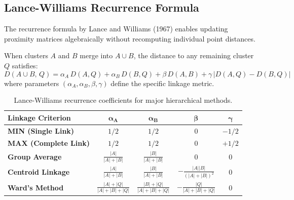 \subsection{Lance-Williams Recurrence Formula}

The recurrence formula by Lance and Williams (1967) enables updating proximity matrices algebraically without recomputing individual point distances.

\begin{theorem}
When clusters $A$ and $B$ merge into $A \cup B$, the distance to any remaining cluster $Q$ satisfies:
\begin{equation}
    D(A \cup B, \, Q) = \alpha_A \, D(A, Q) + \alpha_B \, D(B, Q) + \beta \, D(A, B) + \gamma \, |D(A, Q) - D(B, Q)|
    \label{eq:dm-lance-williams-general-en}
\end{equation}
where parameters $(\alpha_A, \alpha_B, \beta, \gamma)$ define the specific linkage metric.
\end{theorem}

\begin{table}[htbp]
\centering
\footnotesize
\setlength{\tabcolsep}{4pt}
\renewcommand{\arraystretch}{1.25}
\begin{tabular}{l c c c c}
\toprule
\textbf{Linkage Criterion} & $\mathbf{\alpha_A}$ & $\mathbf{\alpha_B}$ & $\mathbf{\beta}$ & $\mathbf{\gamma}$ \\
\midrule
\textbf{MIN (Single Link)} & $1/2$ & $1/2$ & $0$ & $-1/2$ \\
\textbf{MAX (Complete Link)} & $1/2$ & $1/2$ & $0$ & $+1/2$ \\
\textbf{Group Average} & $\frac{|A|}{|A| + |B|}$ & $\frac{|B|}{|A| + |B|}$ & $0$ & $0$ \\[3pt]
\textbf{Centroid Linkage} & $\frac{|A|}{|A| + |B|}$ & $\frac{|B|}{|A| + |B|}$ & $-\frac{|A||B|}{(|A| + |B|)^2}$ & $0$ \\[3pt]
\textbf{Ward's Method} & $\frac{|A| + |Q|}{|A| + |B| + |Q|}$ & $\frac{|B| + |Q|}{|A| + |B| + |Q|}$ & $-\frac{|Q|}{|A| + |B| + |Q|}$ & $0$ \\
\bottomrule
\end{tabular}
\caption{Lance-Williams recurrence coefficients for major hierarchical methods.}
\label{tab:dm-lance-williams-parameters-en}
\end{table}

